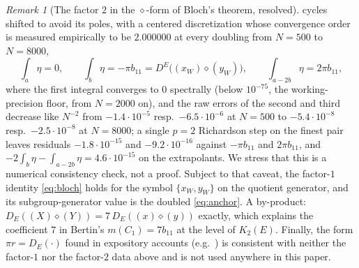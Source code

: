 \documentclass[preprint,12pt]{elsarticle}
\theoremstyle{definition}
\theoremstyle{remark}
\newtheorem{remark}[theorem]{Remark}
\begin{document}
\begin{remark}[The factor $2$ in the $\diamond$-form of Bloch's theorem,
resolved]
cycles shifted to avoid its poles, with a centered discretization whose
convergence order is measured empirically to be $2.000000$ at every
doubling from $N=500$ to $N=8000$,
\[
  \textstyle
  \int_{a}\eta=0,\qquad
  \int_{b}\eta=-\pi b_{11}
   =D^E\bigl((x_W)\diamond(y_W)\bigr),\qquad
  \int_{a-2b}\eta=2\pi b_{11},
\]
where the first integral converges to $0$ spectrally (below $10^{-75}$, the
working-precision floor, from $N=2000$ on), and the raw errors of the
second and third decrease like $N^{-2}$ from $-1.4\cdot10^{-5}$ resp.\
$-6.5\cdot10^{-6}$ at $N=500$ to $-5.4\cdot10^{-8}$ resp.\
$-2.5\cdot10^{-8}$ at $N=8000$; a single $p=2$ Richardson step on the
finest pair leaves residuals $-1.8\cdot10^{-15}$ and $-9.2\cdot10^{-16}$
against $-\pi b_{11}$ and $2\pi b_{11}$, and
$-2\int_b\eta-\int_{a-2b}\eta=4.6\cdot10^{-15}$ on the extrapolants.
We stress that this is a numerical consistency check, not a proof.
Subject to that caveat, the factor-$1$ identity \eqref{eq:bloch} holds for
the symbol
$\{x_W,y_W\}$ on the quotient generator, and its subgroup-generator value is
the doubled \eqref{eq:anchor}.
A by-product: $D_E((X)\diamond(Y))=7\,D_E((x)\diamond(y))$ exactly, which
explains the coefficient $7$ in Bertin's $m(C_1)=7b_{11}$ at the level of
$K_2(E)$. Finally, the form $\pi r=D_E(\cdot)$ found in expository accounts
(e.g.\ \cite[Thm.~1]{Touafek}) is consistent with neither the factor-$1$
nor the factor-$2$ data above and is not used anywhere in this paper.
\end{remark}
\end{document}
